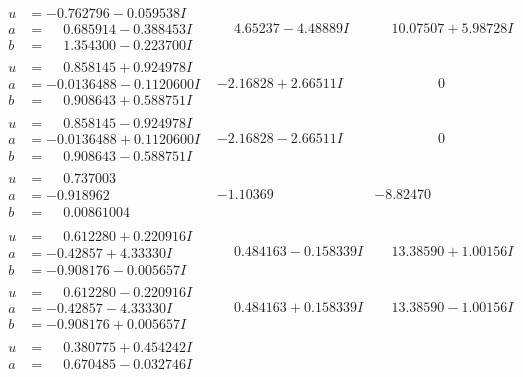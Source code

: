 \documentclass[1p]{elsarticle_modified}
\theoremstyle{definition}
\begin{document}
$$\begin{array}{c|c|c}
\begin{aligned}
u &= -0.762796 - 0.059538 I \\
a &= \phantom{-}0.685914 - 0.388453 I \\
b &= \phantom{-}1.354300 - 0.223700 I\end{aligned}
 & \phantom{-}4.65237 - 4.48889 I & \phantom{-}10.07507 + 5.98728 I \\ \hline\begin{aligned}
u &= \phantom{-}0.858145 + 0.924978 I \\
a &= -0.0136488 - 0.1120600 I \\
b &= \phantom{-}0.908643 + 0.588751 I\end{aligned}
 & -2.16828 + 2.66511 I & \phantom{-0.000000 } 0 \\ \hline\begin{aligned}
u &= \phantom{-}0.858145 - 0.924978 I \\
a &= -0.0136488 + 0.1120600 I \\
b &= \phantom{-}0.908643 - 0.588751 I\end{aligned}
 & -2.16828 - 2.66511 I & \phantom{-0.000000 } 0 \\ \hline\begin{aligned}
u &= \phantom{-}0.737003\phantom{ +0.000000I} \\
a &= -0.918962\phantom{ +0.000000I} \\
b &= \phantom{-}0.00861004\phantom{ +0.000000I}\end{aligned}
 & -1.10369\phantom{ +0.000000I} & -8.82470\phantom{ +0.000000I} \\ \hline\begin{aligned}
u &= \phantom{-}0.612280 + 0.220916 I \\
a &= -0.42857 + 4.33330 I \\
b &= -0.908176 - 0.005657 I\end{aligned}
 & \phantom{-}0.484163 - 0.158339 I & \phantom{-}13.38590 + 1.00156 I \\ \hline\begin{aligned}
u &= \phantom{-}0.612280 - 0.220916 I \\
a &= -0.42857 - 4.33330 I \\
b &= -0.908176 + 0.005657 I\end{aligned}
 & \phantom{-}0.484163 + 0.158339 I & \phantom{-}13.38590 - 1.00156 I \\ \hline\begin{aligned}
u &= \phantom{-}0.380775 + 0.454242 I \\
a &= \phantom{-}0.670485 - 0.032746 I \\

\end{aligned}
\end{array}$$
\end{document}
